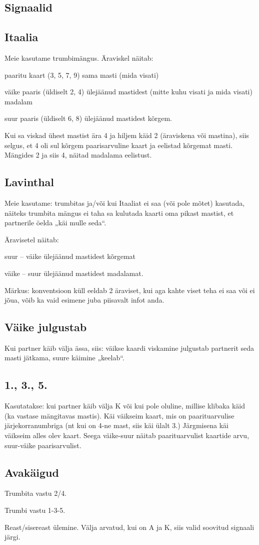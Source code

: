 \documentclass[10pt]{article}
\begin{document}
\begin{multicols*}{2}
\newpage
\section{Signaalid}
\subsection{Itaalia}

Meie kasutame trumbimängus.
Äraviskel näitab:

paaritu kaart (3, 5, 7, 9)	 sama masti (mida visati)

väike paaris (üldiselt 2, 4)	 ülejäänud mastidest (mitte kuhu visati ja mida visati) madalam

suur paaris (üldiselt 6, 8)	 ülejäänud mastidest kõrgem.

Kui sa viskad ühest mastist ära 4 ja hiljem käid 2 (äraviskena või mastina),
siis selgus, et 4 oli sul kõrgem paarisarvuline kaart ja eelistad kõrgemat
masti. Mängides 2 ja siis 4, näitad madalama eelistust.

\subsection{Lavinthal}

Meie kasutame: trumbitas ja/või kui Itaaliat ei saa (või pole mõtet) kasutada, näiteks trumbita mängus ei taha sa kulutada kaarti oma pikast mastist, et partnerile öelda „käi mulle seda“.

Äravisetel näitab:

suur – väike ülejäänud mastidest kõrgemat

väike – suur ülejäänud mastidest madalamat.

Märkus: konventsioon küll eeldab 2 äraviset, kui aga kahte viset teha ei saa või ei jõua, võib ka vaid esimene juba piisavalt infot anda.

\subsection{Väike julgustab}

Kui partner käib välja ässa, siis: väikse kaardi viskamine julgustab partnerit seda masti jätkama, suure käimine „keelab“.

\subsection{1., 3., 5.}

Kasutatakse: kui partner käib välja K või kui pole oluline, millise klibaka käid (ka vastase mängitavas mastis). Käi väikseim kaart, mis on paarituarvulise järjekorranumbriga (nt kui on 4-ne mast, siis käi ülalt 3.) Järgmisena käi väikseim alles olev kaart. Seega väike-suur näitab paarituarvulist kaartide arvu, suur-väike paarisarvulist.

\subsection{Avakäigud}
Trumbita vastu 2/4.

Trumbi vastu 1-3-5.

Reast/sisereast ülemine. Välja arvatud, kui on A ja K, siis valid soovitud signaali järgi.

\end{multicols*}
\end{document}
